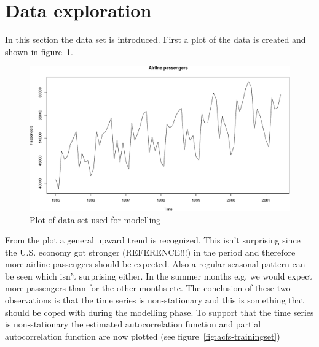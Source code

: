 \section*{Data exploration}
In this section the data set is introduced. First a plot of the data is created and shown in figure~\ref{fig:trainingset}. \par
\begin{figure}[ht]
\centering
\includegraphics[width=120mm]{../plots/trainingset.pdf}
\caption{Plot of data set used for modelling}
\label{fig:trainingset}
\end{figure}
From the plot a general upward trend is recognized. This isn't surprising since the U.S. economy got stronger (REFERENCE!!!) in the period and therefore more airline passengers should be expected. Also a regular seasonal pattern can be seen which isn't surprising either. In the summer months e.g. we would expect more passengers than for the other months etc. The conclusion of these two observations is that the time series is non-stationary and this is something that should be coped with during the modelling phase. To support that the time series is non-stationary the estimated autocorrelation function and partial autocorrelation function are now plotted (see figure~\ref{fig:acfs-trainingset})
